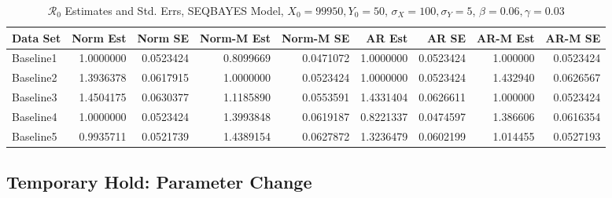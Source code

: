 \documentclass[12pt]{article}
\newcommand{\rr}{\ensuremath{\mathcal{R}_0}}
\begin{document}
\begin{table}[H]
	
	\caption{\label{tab:}$\rr$ Estimates and Std. Errs, SEQBAYES Model,
		$X_0 = 99950, Y_0 = 50$, $\sigma_X = 100, \sigma_Y = 5$, $\beta = 0.06, \gamma = 0.03$}
	\centering
	\begin{footnotesize}
	\begin{tabular}[t]{l|r|r|r|r|r|r|r|r}
		\hline
		Data Set & Norm Est & Norm SE & Norm-M Est & Norm-M SE & AR Est & AR SE & AR-M Est & AR-M SE\\
		\hline
		Baseline1 & 1.0000000 & 0.0523424 & 0.8099669 & 0.0471072 & 1.0000000 & 0.0523424 & 1.000000 & 0.0523424\\
		\hline
		Baseline2 & 1.3936378 & 0.0617915 & 1.0000000 & 0.0523424 & 1.0000000 & 0.0523424 & 1.432940 & 0.0626567\\
		\hline
		Baseline3 & 1.4504175 & 0.0630377 & 1.1185890 & 0.0553591 & 1.4331404 & 0.0626611 & 1.000000 & 0.0523424\\
		\hline
		Baseline4 & 1.0000000 & 0.0523424 & 1.3993848 & 0.0619187 & 0.8221337 & 0.0474597 & 1.386606 & 0.0616354\\
		\hline
		Baseline5 & 0.9935711 & 0.0521739 & 1.4389154 & 0.0627872 & 1.3236479 & 0.0602199 & 1.014455 & 0.0527193\\
		\hline
	\end{tabular}
\end{footnotesize}
\end{table}

\subsection{Temporary Hold: Parameter Change}
\end{document}
